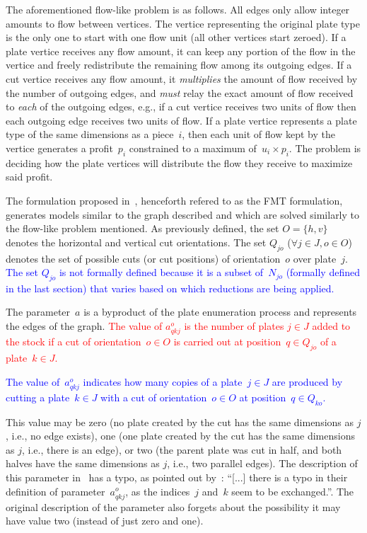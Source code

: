 \documentclass[ppgc,tese,english,formais,babel]{iiufrgs}
\newif\iffinalversion
\newcommand{\newtext}[1]{\iffinalversion%
#1%
\else%
\textcolor{blue}{#1}%
\fi%
}
\newcommand{\oldtext}[1]{\iffinalversion%
\else%
\textcolor{red}{#1}%
\fi%
}
\begin{document}
The aforementioned flow-like problem is as follows.
All edges only allow integer amounts to flow between vertices.
The vertice representing the original plate type is the only one to start with one flow unit (all other vertices start zeroed).
If a plate vertice receives any flow amount, it can keep any portion of the flow in the vertice and freely redistribute the remaining flow among its outgoing edges.
If a cut vertice receives any flow amount, it \emph{multiplies} the amount of flow received by the number of outgoing edges, and \emph{must} relay the exact amount of flow received to \emph{each} of the outgoing edges, e.g., if a cut vertice receives two units of flow then each outgoing edge receives two units of flow.
If a plate vertice represents a plate type of the same dimensions as a piece~\(i\), then each unit of flow kept by the vertice generates a profit~\(p_i\) constrained to a maximum of~\(u_i \times p_i\).
The problem is deciding how the plate vertices will distribute the flow they receive to maximize said profit.

The formulation proposed in~\cite{furini:2016}, henceforth refered to as the FMT formulation, generates models similar to the graph described and which are solved similarly to the flow-like problem mentioned.
As previously defined, the set \(O = \{h, v\}\) denotes the horizontal and vertical cut orientations.
The set \(Q_{jo}\) (\(\forall j \in J, o \in O\)) denotes the set of possible cuts (or cut positions) of orientation~\(o\) over plate~\(j\).
\newtext{The set \(Q_{jo}\) is not formally defined because it is a subset of~\(N_{jo}\) (formally defined in the last section) that varies based on which reductions are being applied.}

The parameter~\(a\) is a byproduct of the plate enumeration process and represents the edges of the graph.
\oldtext{The value of \(a^o_{qkj}\) is the number of plates \(j \in J\) added to the stock if a cut of orientation~\(o \in O\) is carried out at position~\(q \in Q_{jo}\) of a plate~\(k \in J\).}
\newtext{The value of~\(a^o_{qkj}\) indicates how many copies of a plate~\(j \in J\) are produced by cutting a plate~\(k \in J\) with a cut of orientation~\(o \in O\) at position~\(q \in Q_{ko}\).}
This value may be zero (no plate created by the cut has the same dimensions as \(j\), i.e., no edge exists), one (one plate created by the cut has the same dimensions as \(j\), i.e., there is an edge), or two (the parent plate was cut in half, and both halves have the same dimensions as \(j\), i.e., two parallel edges).
The description of this parameter in~\citet{furini:2016} has a typo, as pointed out by~\citet{martin:2020}:
``[...] there is a typo in their definition of parameter~\(a^o_{qkj}\), as the indices~\(j\) and~\(k\) seem to be exchanged.''.
The original description of the parameter also forgets about the possibility it may have value two (instead of just zero and one).
\end{document}
